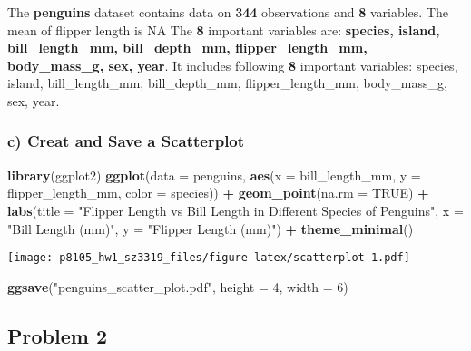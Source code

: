 \documentclass[
]{article}
\newenvironment{Shaded}{\begin{snugshade}}{\end{snugshade}}
\newcommand{\AttributeTok}[1]{\textcolor[rgb]{0.13,0.29,0.53}{#1}}
\newcommand{\ConstantTok}[1]{\textcolor[rgb]{0.56,0.35,0.01}{#1}}
\newcommand{\DecValTok}[1]{\textcolor[rgb]{0.00,0.00,0.81}{#1}}
\newcommand{\FunctionTok}[1]{\textcolor[rgb]{0.13,0.29,0.53}{\textbf{#1}}}
\newcommand{\NormalTok}[1]{#1}
\newcommand{\SpecialCharTok}[1]{\textcolor[rgb]{0.81,0.36,0.00}{\textbf{#1}}}
\newcommand{\StringTok}[1]{\textcolor[rgb]{0.31,0.60,0.02}{#1}}
\begin{document}
The \textbf{penguins} dataset contains data on \textbf{344} observations
and \textbf{8} variables. The mean of flipper length is NA The
\textbf{8} important variables are: \textbf{species, island,
bill\_length\_mm, bill\_depth\_mm, flipper\_length\_mm, body\_mass\_g,
sex, year}. It includes following \textbf{8} important variables:
species, island, bill\_length\_mm, bill\_depth\_mm, flipper\_length\_mm,
body\_mass\_g, sex, year.

\subsubsection{c) Creat and Save a
Scatterplot}\label{c-creat-and-save-a-scatterplot}

\begin{Shaded}
\begin{Highlighting}[]
\FunctionTok{library}\NormalTok{(ggplot2)}
\FunctionTok{ggplot}\NormalTok{(}\AttributeTok{data =}\NormalTok{ penguins, }\FunctionTok{aes}\NormalTok{(}\AttributeTok{x =}\NormalTok{ bill\_length\_mm, }\AttributeTok{y =}\NormalTok{ flipper\_length\_mm, }\AttributeTok{color =}\NormalTok{ species)) }\SpecialCharTok{+}
  \FunctionTok{geom\_point}\NormalTok{(}\AttributeTok{na.rm =} \ConstantTok{TRUE}\NormalTok{) }\SpecialCharTok{+}
  \FunctionTok{labs}\NormalTok{(}\AttributeTok{title =} \StringTok{"Flipper Length vs Bill Length in Different Species of Penguins"}\NormalTok{,}
       \AttributeTok{x =} \StringTok{"Bill Length (mm)"}\NormalTok{,}
       \AttributeTok{y =} \StringTok{"Flipper Length (mm)"}\NormalTok{) }\SpecialCharTok{+}
  \FunctionTok{theme\_minimal}\NormalTok{()}
\end{Highlighting}
\end{Shaded}

\texttt{[image: p8105\_hw1\_sz3319\_files/figure-latex/scatterplot-1.pdf]}

\begin{Shaded}
\begin{Highlighting}[]
\FunctionTok{ggsave}\NormalTok{(}\StringTok{"penguins\_scatter\_plot.pdf"}\NormalTok{, }\AttributeTok{height =} \DecValTok{4}\NormalTok{, }\AttributeTok{width =} \DecValTok{6}\NormalTok{)}
\end{Highlighting}
\end{Shaded}

\subsection{Problem 2}\label{problem-2}
\end{document}
